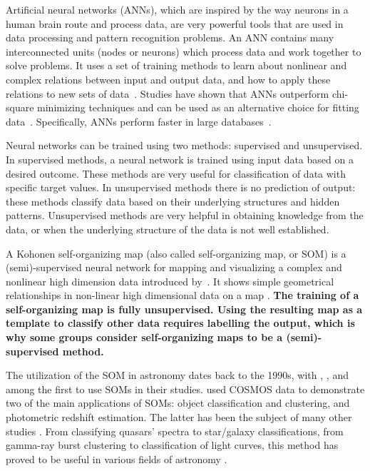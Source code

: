 Artificial neural networks (ANNs), which are inspired by the way neurons in a human brain route and process data, are very powerful tools that are used in data processing and pattern recognition problems.
An ANN contains many interconnected units (nodes or neurons) which process data and work together to solve problems.
It uses a set of training methods to learn about nonlinear and complex relations between input and output data, and how to apply these relations to new sets of data~\citep[e.g.][]{Hossein14,Hossein16a,Hossein16b,Ellison16a, Ellison16b}.
Studies have shown that ANNs outperform chi-square minimizing techniques and can be used as an alternative choice for fitting data~\citep[e.g.][]{Marquez91}.
Specifically, ANNs perform faster in large databases~\citep[][]{Gulati97}.

Neural networks can be trained using two methods: supervised and unsupervised.
In supervised methods, a neural network is trained using input data based on a desired outcome.
These methods are very useful for classification of data with specific target values.
In unsupervised methods there is no prediction of output:
these methods classify data based on their underlying structures and hidden patterns.
Unsupervised methods are very helpful in obtaining knowledge from the data, or when the underlying structure of the data is not well established.

A Kohonen self-organizing map (also called self-organizing map, or SOM) is a (semi)-supervised neural network for mapping and visualizing a complex and nonlinear high dimension data introduced by~\citet{Kohonen82}.
It shows simple geometrical relationships in non-linear high dimensional data on a map \citep{Kohonen98}.
\textbf{The training of a self-organizing map is fully unsupervised.
     Using the resulting map as a template to classify other data requires labelling the output, which is why some groups consider self-organizing maps to be a (semi)-supervised method.}


The utilization of the SOM in astronomy dates back to the 1990s, with \citet[][]{Odewahn92}, \citet[][]{Hernandez94}, and \citet[][]{Murtagh95} among the first to use SOMs in their studies.
\citet{Geach12} used COSMOS data to demonstrate two of the main applications of SOMs: object classification and clustering, and photometric redshift estimation. The latter has been the subject of many other studies \citep[e.g.][]{Kind14a}.
From classifying quasars' spectra to star/galaxy classifications, from gamma-ray burst clustering to classification of light curves, this method has proved to be useful in various fields of astronomy \citep[e.g.][]{Maehoenen95, Miller96, Andreon00, Balastegui01, Rajaniemi02, Brett04, Scaringi09}.


